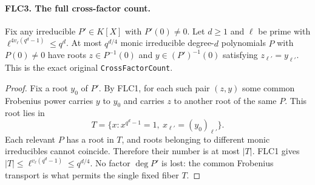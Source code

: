 \documentclass[11pt,a4paper]{article}
\numberwithin{equation}{section}
\theoremstyle{remark}\newtheorem{remark}[theorem]{Remark}
\begin{document}
\paragraph{FLC3. The full cross-factor count.}
\label{claim:FLC3}
Fix any irreducible $P'\in K[X]$ with $P'(0)\ne0$.
Let $d\ge1$ and $\ell$ be prime with
$\ell^{4v_\ell(q^d-1)}\le q^d$.
At most $q^{d/4}$ monic irreducible degree-$d$ polynomials $P$
with $P(0)\ne0$ have roots $z\in P^{-1}(0)$ and
$y\in(P')^{-1}(0)$ satisfying $z_{\ell'}=y_{\ell'}$.
This is the exact original \texttt{Cross\allowbreak Factor\allowbreak Count}.
\begin{proof}
Fix a root $y_0$ of $P'$.  By FLC1, for each such pair $(z,y)$
some common Frobenius power carries $y$ to $y_0$ and carries $z$
to another root of the same $P$.  This root lies in
\[
 T=\{x:x^{q^d-1}=1,\ x_{\ell'}=(y_0)_{\ell'}\}.
\]
Each relevant $P$ has a root in $T$, and roots belonging to
different monic irreducibles cannot coincide.  Therefore their
number is at most $|T|$.  FLC1 gives
$|T|\le\ell^{v_\ell(q^d-1)}\le q^{d/4}$.
No factor $\deg P'$ is lost: the common Frobenius transport is
what permits the single fixed fiber $T$.
\end{proof}

\end{document}
